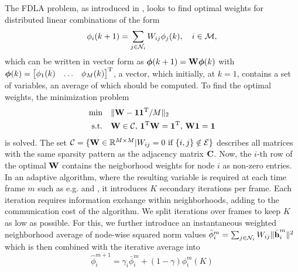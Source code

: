\documentclass{article}
\begin{document}
The FDLA problem, as introduced in \cite{xiaoFastLinearIterations2004}, looks to find optimal weights for distributed linear combinations of the form
\begin{equation}
    \phi_i({k+1}) = \sum_{j \in \mathcal{N}_i} W_{ij} \phi_j({k}),\quad i\in \mathcal{M},\label{eq:adaptivenormest:distlincomb}
\end{equation}
which can be written in vector form as \(\bm{\phi}({k+1}) = \bm{\mathrm{W}} \bm{\phi}({k})\) with \(\bm{\phi}(k) = \begin{bmatrix} \phi_1(k) & \ldots & \phi_M(k) \end{bmatrix}^{\mathrm{T}}\), a vector, which initially, at \(k=1\), contains a set of variables, an average of which should be computed.
To find the optimal weights, the minimization problem
\begin{equation}
    \begin{aligned}
        \min& \quad \| \bm{\mathrm{W}} - \bm{1}\bm{1}^{\mathrm{T}}/M\|_2\\
        \text{s.t.}& \quad \bm{\mathrm{W}} \in \mathcal{C},\, \bm{1}^{\mathrm{T}} \bm{\mathrm{W}} = \bm{1}^{\mathrm{T}},\, \bm{\mathrm{W}} \bm{1}= \bm{1}
    \end{aligned}\label{eq:adaptivenormest:fdlaminprob}
\end{equation}
is solved.
The set \(\mathcal{C} = \{\bm{\mathrm{W}} \in \mathbb{R}^{M \times M} \vert W_{ij} = 0 \text{ if } \{i,j\} \notin \mathcal{E}\}\) describes all matrices with the same sparsity pattern as the adjacency matrix \(\bm{\mathrm{C}}\).
Now, the \(i\)-th row of the optimal \(\bm{\mathrm{W}}\) contains the neigborhood weights for node \(i\) as non-zero entries.
In an adaptive algorithm, where the resulting variable is required at each time frame \(m\) such as e.g. \cite{yuDistributedBlindSystem2014, liuDistributedBlindIdentification2016} and \cite{blochbergerDBSI}, it introduces \(K\) secondary iterations per frame.
Each iteration requires information exchange within neighborhoods, adding to the communication cost of the algorithm.
We split iterations over frames to keep \(K\) as low as possible.
For this, we further introduce an instantaneous weighted neighborhood average of node-wise squared norm values \(\bar{\phi}_i^{m} = \sum_{j \in \mathcal{N}_i} W_{ij} \|\bar{\bm{\mathrm{h}}}_i^m\|^2\) which is then combined with the iterative average into
\begin{equation}
    \hat{\phi}_i^{m+1} = \gamma_i \bar{\phi}_i^{m} + (1-\gamma) \phi_i^{m}(K)
\end{equation}
\end{document}
